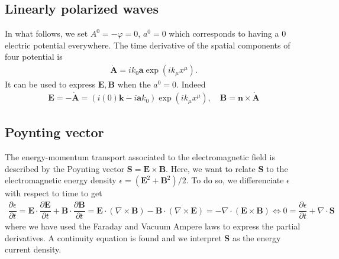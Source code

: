 \documentclass[10pt, a4paper]{article}
\begin{document}
{\subsection{Linearly polarized waves}

In what follows, we set $A^0 = -\varphi = 0$, $a^0 = 0$ which corresponds to having a $0$ electric potential everywhere. The time derivative of the spatial components of four potential is
\begin{align*} 
    \dot{\mathbf{A}} = i k_0 \mathbf{a} \exp \left(i k_\mu x^\mu\right).
\end{align*}
It can be used to express $\mathbf{E}, \mathbf{B}$ when the $a^0 = 0$. Indeed
\begin{align*}
    \mathbf{E} =  -\mathbf{\dot{A}} =  (i (0) \mathbf{k} - i\mathbf{a} k_0)  \exp \left(i k_\mu x^\mu\right),\quad \mathbf{B} =  \mathbf{n} \times \dot{\mathbf{A}}
\end{align*}
\subsection{Poynting vector}
The energy-momentum transport associated to the electromagnetic field is described by the Poynting vector $\mathbf{S} = \mathbf{E} \times \mathbf{B}$. Here, we want to relate $\mathbf{S}$ to the electromagnetic energy density $\epsilon = (\mathbf{E}^2 +  \mathbf{B}^2)/2$. To do so, we differenciate $\epsilon$ with respect to time to get 
\begin{align*}
    \dfrac{\partial \epsilon}{\partial t} = \mathbf{E} \cdot \dfrac{\partial \mathbf{E}}{\partial t} + \mathbf{B} \cdot \dfrac{\partial \mathbf{B}}{\partial t} = \mathbf{E} \cdot \left(\nabla \times \mathbf{B}\right) - \mathbf{B} \cdot \left(\nabla \times \mathbf{E}\right) = - \nabla  \cdot \left(\mathbf{E} \times \mathbf{B}\right) \iff 0 = \dfrac{\partial \epsilon}{\partial t} + \nabla  \cdot \mathbf{S}
\end{align*}
where we have used the Faraday and Vacuum Ampere laws to express the partial derivatives. A continuity equation is found and we interpret $\mathbf{S}$ as the energy current density. 

}
\end{document}
